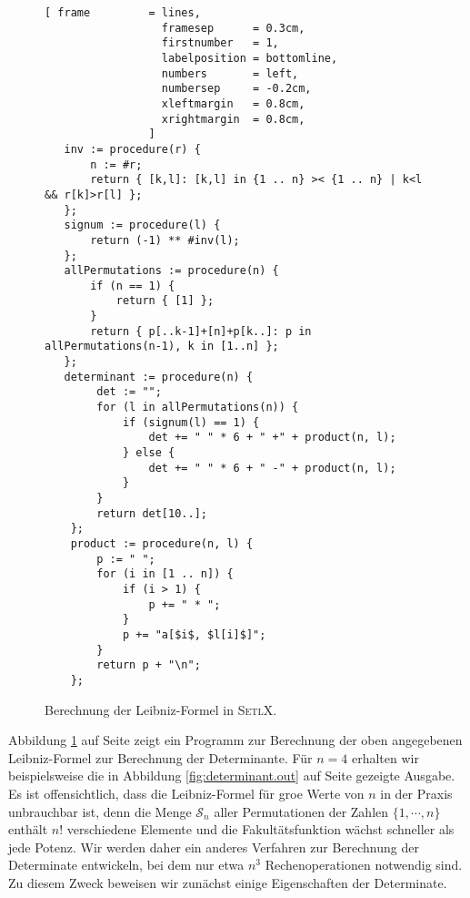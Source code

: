 \begin{figure}[!ht]
\centering
\begin{Verbatim}[ frame         = lines, 
                  framesep      = 0.3cm, 
                  firstnumber   = 1,
                  labelposition = bottomline,
                  numbers       = left,
                  numbersep     = -0.2cm,
                  xleftmargin   = 0.8cm,
                  xrightmargin  = 0.8cm,
                ]
   inv := procedure(r) {
       n := #r;
       return { [k,l]: [k,l] in {1 .. n} >< {1 .. n} | k<l && r[k]>r[l] };
   };
   signum := procedure(l) {
       return (-1) ** #inv(l);
   };
   allPermutations := procedure(n) {
       if (n == 1) {
           return { [1] };
       }
       return { p[..k-1]+[n]+p[k..]: p in allPermutations(n-1), k in [1..n] };
   };
   determinant := procedure(n) {
        det := "";
        for (l in allPermutations(n)) {
            if (signum(l) == 1) {
                det += " " * 6 + " +" + product(n, l);
            } else {
                det += " " * 6 + " -" + product(n, l);
            }
        }
        return det[10..];
    };   
    product := procedure(n, l) {
        p := " ";
        for (i in [1 .. n]) {
            if (i > 1) {
                p += " * ";
            }
            p += "a[$i$, $l[i]$]";
        }
        return p + "\n";
    };
\end{Verbatim}
\vspace*{-0.3cm}
\caption{Berechnung der Leibniz-Formel in \textsc{SetlX}.}
\label{fig:determinant-formula.stlx}
\end{figure}

Abbildung \ref{fig:determinant-formula.stlx} auf Seite \pageref{fig:determinant-formula.stlx} zeigt ein Programm zur
Berechnung der oben angegebenen Leibniz-Formel zur Berechnung der Determinante.  F\"ur $n=4$ erhalten
wir beispielsweise die in Abbildung \ref{fig:determinant.out} auf Seite
\pageref{fig:determinant.out} gezeigte Ausgabe.  Es ist offensichtlich, dass die Leibniz-Formel f\"ur
gro\3e Werte von $n$ in der Praxis unbrauchbar ist, denn die
Menge $\mathcal{S}_n$ aller Permutationen der Zahlen $\{1,\cdots,n\}$ enth\"alt $n!$ verschiedene
Elemente und die Fakult\"atsfunktion w\"achst schneller als jede Potenz.  Wir werden daher
ein anderes Verfahren zur Berechnung der Determinate entwickeln, bei dem nur etwa $n^3$
Rechenoperationen notwendig sind.  Zu diesem Zweck beweisen wir zun\"achst einige Eigenschaften der
Determinate.  

